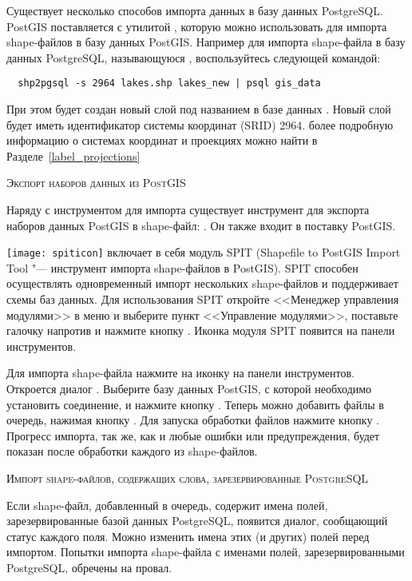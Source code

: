 Существует несколько способов импорта данных в базу данных PostgreSQL. PostGIS
поставляется с утилитой , которую можно использовать для
импорта shape-файлов в базу данных PostGIS. Например для импорта shape-файла
 в базу данных PostgreSQL, называющуюся
, воспользуйтесь следующей командой:

\begin{verbatim}
  shp2pgsql -s 2964 lakes.shp lakes_new | psql gis_data
\end{verbatim}

При этом будет создан новый слой под названием  в
базе данных . Новый слой будет иметь идентификатор
системы координат (SRID) 2964. более подробную информацию о системах координат
и проекциях можно найти в Разделе~\ref{label_projections}
\begin{Tip}
\caption{\textsc{Экспорт наборов данных из PostGIS}}
Наряду с инструментом для импорта  существует инструмент
для экспорта наборов данных PostGIS в shape-файл: .
Он также входит в поставку PostGIS.
\end{Tip}

\texttt{[image: spiticon]} \qg включает в себя модуль
SPIT (Shapefile to PostGIS Import Tool "--- инструмент импорта shape-файлов
в PostGIS). SPIT способен осуществлять одновременный
импорт нескольких shape-файлов и поддерживает схемы баз данных. Для
использования SPIT откройте <<Менеджер управления модулями>> \qg в меню
 и выберите пункт <<Управление модулями>>, поставьте
галочку напротив  и нажмите кнопку . Иконка
модуля SPIT появится на панели инструментов.

Для импорта shape-файла нажмите на иконку 
на панели инструментов. \\
Откроется диалог .
Выберите базу данных PostGIS, с которой необходимо установить соединение, и
нажмите кнопку . Теперь можно добавить файлы в
очередь, нажимая кнопку . Для запуска обработки файлов
нажмите кнопку . Прогресс импорта, так же, как и любые ошибки
или предупреждения, будет показан после обработки каждого из shape-файлов.

\begin{Tip}\caption{\textsc{Импорт shape-файлов, содержащих
слова, зарезервированные PostgreSQL}}
Если shape-файл, добавленный в очередь, содержит имена полей, зарезервированные
базой данных PostgreSQL, появится диалог, сообщающий статус каждого поля.
Можно изменить имена этих (и других) полей
перед импортом. Попытки импорта shape-файла с именами полей, зарезервированными
PostgreSQL, обречены на провал.
\end{Tip}

